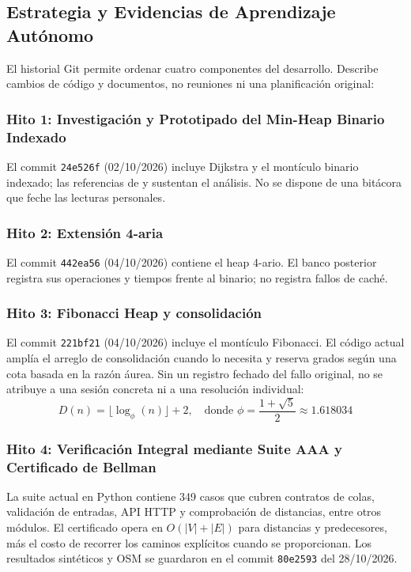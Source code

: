 \subsection{Estrategia y Evidencias de Aprendizaje Autónomo}
\label{sec:estrategia_evidencias}
El historial Git permite ordenar cuatro componentes del desarrollo. Describe cambios de código y documentos, no reuniones ni una planificación original:

\subsubsection{Hito 1: Investigación y Prototipado del Min-Heap Binario Indexado}
El commit \texttt{24e526f} (02/10/2026) incluye Dijkstra y el montículo binario indexado; las referencias de \textcite{cormen2022introduction} y \textcite{fredman1987fibonacci} sustentan el análisis. No se dispone de una bitácora que feche las lecturas personales.

\subsubsection{Hito 2: Extensión 4-aria}
El commit \texttt{442ea56} (04/10/2026) contiene el heap 4-ario. El banco posterior registra sus operaciones y tiempos frente al binario; no registra fallos de caché.

\subsubsection{Hito 3: Fibonacci Heap y consolidación}
El commit \texttt{221bf21} (04/10/2026) incluye el montículo Fibonacci. El código actual amplía el arreglo de consolidación cuando lo necesita y reserva grados según una cota basada en la razón áurea. Sin un registro fechado del fallo original, no se atribuye a una sesión concreta ni a una resolución individual:
\begin{equation}
    D(n) = \lfloor \log_\phi(n) \rfloor + 2, \quad \text{donde } \phi = \frac{1 + \sqrt{5}}{2} \approx 1.618034
\end{equation}

\subsubsection{Hito 4: Verificación Integral mediante Suite AAA y Certificado de Bellman}
La suite actual en Python contiene 349 casos que cubren contratos de colas, validación de entradas, API HTTP y comprobación de distancias, entre otros módulos. El certificado opera en $O(|V|+|E|)$ para distancias y predecesores, más el costo de recorrer los caminos explícitos cuando se proporcionan. Los resultados sintéticos y OSM se guardaron en el commit \texttt{80e2593} del 28/10/2026.

